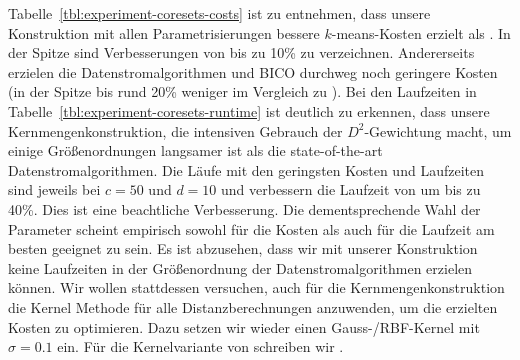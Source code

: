 Tabelle~\ref{tbl:experiment-coresets-costs} ist zu entnehmen, dass unsere Konstruktion mit allen Parametrisierungen bessere
$k$-means-Kosten erzielt als \kmpp. In der Spitze sind Verbesserungen von bis zu 10\% zu verzeichnen. Andererseits erzielen
die Datenstromalgorithmen \Skmpp und BICO durchweg noch geringere Kosten (in der Spitze bis rund 20\% weniger im Vergleich
zu \kmpp). Bei den Laufzeiten in Tabelle~\ref{tbl:experiment-coresets-runtime} ist deutlich zu erkennen, dass unsere
Kernmengenkonstruktion, die intensiven Gebrauch der $D^2$-Gewichtung macht, um einige Größenordnungen langsamer ist als die
state-of-the-art Datenstromalgorithmen. Die Läufe mit den geringsten Kosten und Laufzeiten sind jeweils bei $c = 50$ und
$d = 10$ und verbessern die Laufzeit von \kmpp{} um bis zu 40\%. Dies ist eine beachtliche Verbesserung.
Die dementsprechende Wahl der Parameter scheint empirisch sowohl für die Kosten als auch für die Laufzeit am besten geeignet
zu sein. 
\absatz
Es ist abzusehen, dass wir mit unserer Konstruktion keine
Laufzeiten in der Größenordnung der Datenstromalgorithmen erzielen können. Wir wollen stattdessen versuchen,
auch für die Kernmengenkonstruktion die Kernel Methode für alle Distanzberechnungen anzuwenden, um die erzielten Kosten zu
optimieren. Dazu setzen wir wieder einen Gauss-/RBF-Kernel mit $\sigma = 0.1$ ein. Für die Kernelvariante von \CsTwo{} schreiben
wir \KCsTwo.

